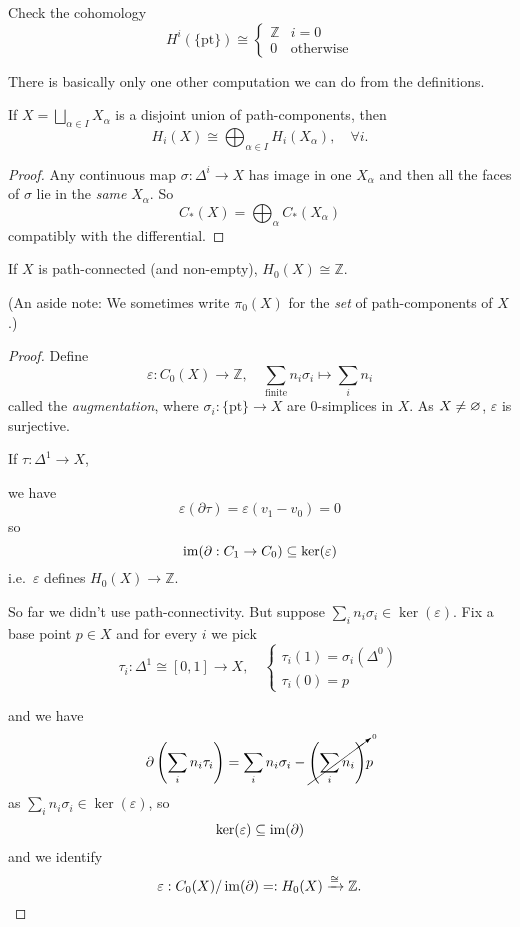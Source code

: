 \documentclass[a4paper,11pt]{article}
\begin{document}
	

	\begin{exer}
		Check the cohomology 
		\[
			H^i(\{\text{pt}\}) \cong \begin{cases}
				\mathbb{Z} & i = 0\\
				0 & \text{otherwise}
			\end{cases}
		\]
	\end{exer}

	There is basically only one other computation we can do from the definitions.

	\begin{lem}
		If $X = \bigsqcup_{\alpha \in I} X_\alpha$ is a disjoint union of path-components, then
		\[
			H_i(X) \cong \bigoplus_{\alpha \in I} H_i (X_\alpha), \quad \forall i.
		\]
	\end{lem}

	\begin{proof}
		Any continuous map $\sigma : \Delta^i \to X$ has image in one $X_\alpha$ and then all the faces of $\sigma$ lie in the \emph{same} $X_\alpha$. So
		\[
			C_*(X) = \bigoplus_\alpha C_*(X_\alpha)
		\]
		compatibly with the differential.
	\end{proof}

	\begin{lem}
		If $X$ is path-connected (and non-empty), $H_0 (X) \cong \mathbb{Z}$.
	\end{lem}

	(An aside note: We sometimes write $\pi_0(X)$ for the \emph{set} of path-components of $X$.)

	\begin{proof}
		Define 
		\[
			\varepsilon: C_0 (X) \to \mathbb{Z}, \quad \sum_{\text{finite}} n_i \sigma_i \mapsto \sum_i n_i
		\]
		called the \emph{augmentation}, where $\sigma_i : \{\text{pt}\} \to X$ are 0-simplices in $X$. As $X \neq \varnothing$, $\varepsilon$ is surjective.
		
		If $\tau : \Delta^1 \to X$, 
		

		we have
		\[
			\varepsilon(\partial \tau) = \varepsilon(v_1 - v_0) = 0
		\]
		so
		\[
			\operatorname{im}(\partial: C_1 \to C_0) \subseteq \ker(\varepsilon)
		\]
		i.e.\ $\varepsilon$ defines $H_0(X) \to \mathbb{Z}$.

		So far we didn't use path-connectivity. But suppose $\sum_i n_i \sigma_i \in \ker(\varepsilon)$. Fix a base point $p \in X$ and for every $i$ we pick
		\[
			\tau_i : \Delta^1 \cong [0,1] \to X, \quad \begin{cases}
				\tau_i (1) = \sigma_i (\Delta^0)\\
				\tau_i (0) = p
			\end{cases}
		\]


		and we have
		\[
			\partial \left( \sum_i n_i \tau_i \right) = \sum_i n_i \sigma_i - \cancelto{\text{\tiny 0}}{\left( \sum_i n_i \right)} p 
		\]
		as $\sum_i n_i \sigma_i \in \ker(\varepsilon)$, so
		\[
			\ker(\varepsilon) \subseteq \operatorname{im}(\partial)
		\]
		and we identify
		\[
			\varepsilon : C_0(X) / \operatorname{im}(\partial) =: H_0 (X) \xrightarrow{\cong} \mathbb{Z}.
		\]
		
	\end{proof}
\end{document}
